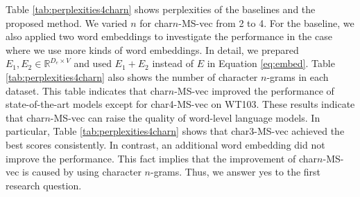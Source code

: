 \documentclass[letterpaper]{article} %
\begin{document}
Table \ref{tab:perplexities4charn} shows perplexities of the baselines and the proposed method.
We varied $n$ for char$n$-MS-vec from 2 to 4.
For the baseline, we also applied two word embeddings to investigate the performance in the case where we use more kinds of word embeddings.
In detail, we prepared $E_1, E_2 \in \mathbb{R}^{D_e \times V}$ and used $E_1 + E_2$ instead of $E$ in Equation \ref{eq:embed}.
Table \ref{tab:perplexities4charn} also shows the number of character $n$-grams in each dataset.
This table indicates that char$n$-MS-vec improved the performance of state-of-the-art models except for char4-MS-vec on WT103.
These results indicate that char$n$-MS-vec can raise the quality of word-level language models.
In particular, Table \ref{tab:perplexities4charn} shows that char3-MS-vec achieved the best scores consistently.
In contrast, an additional word embedding did not improve the performance.
This fact implies that the improvement of char$n$-MS-vec is caused by using character $n$-grams.
Thus, we answer yes to the first research question.
\end{document}
